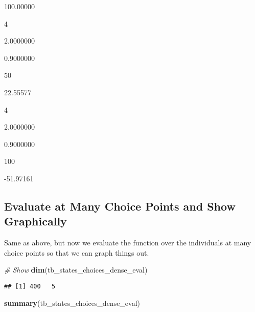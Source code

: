 \documentclass[]{article}
\newenvironment{Shaded}{\begin{snugshade}}{\end{snugshade}}
\newcommand{\CommentTok}[1]{\textcolor[rgb]{0.56,0.35,0.01}{\textit{#1}}}
\newcommand{\DataTypeTok}[1]{\textcolor[rgb]{0.13,0.29,0.53}{#1}}
\newcommand{\KeywordTok}[1]{\textcolor[rgb]{0.13,0.29,0.53}{\textbf{#1}}}
\newcommand{\NormalTok}[1]{#1}
\newcommand{\OperatorTok}[1]{\textcolor[rgb]{0.81,0.36,0.00}{\textbf{#1}}}
\newcommand{\StringTok}[1]{\textcolor[rgb]{0.31,0.60,0.02}{#1}}
\begin{document}
100.00000

4

2.0000000

0.9000000

50

22.55577

4

2.0000000

0.9000000

100

-51.97161

\hypertarget{evaluate-at-many-choice-points-and-show-graphically}{%
\subsection{Evaluate at Many Choice Points and Show
Graphically}\label{evaluate-at-many-choice-points-and-show-graphically}}

Same as above, but now we evaluate the function over the individuals at
many choice points so that we can graph things out.

\begin{Shaded}
\end{Shaded}

\begin{Shaded}
\begin{Highlighting}[]
\CommentTok{# Show}
\KeywordTok{dim}\NormalTok{(tb_states_choices_dense_eval)}
\end{Highlighting}
\end{Shaded}

\begin{verbatim}
## [1] 400   5
\end{verbatim}

\begin{Shaded}
\begin{Highlighting}[]
\KeywordTok{summary}\NormalTok{(tb_states_choices_dense_eval)}
\end{Highlighting}
\end{Shaded}
\end{document}
